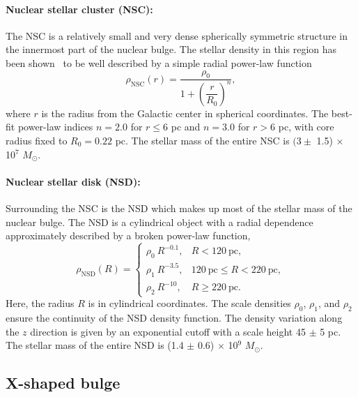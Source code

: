 \documentclass[doublespace,nopageskip]{VTthesis}
\begin{document}
\paragraph{Nuclear stellar cluster (NSC):} The NSC is a relatively small and very dense spherically symmetric structure in the innermost part of the nuclear bulge. The stellar density in this region has been shown~\cite{2002A&A...384..112L} to be well described by a simple radial power-law function
\begin{equation}\label{eq:NSC}
  \rho_{\text{NSC}}(r)=\dfrac{\rho_0}{1+\left(\dfrac{r}{R_0}\right)^{n}},
\end{equation}
{where $r$ is the radius from the Galactic center in spherical coordinates.} The best-fit power-law indices $n = 2.0$ for $r \leq 6$ pc and $n = 3.0$ for $r > 6$ pc, with core radius fixed to $R_0 = 0.22$ pc. The stellar mass of the entire NSC is $(3\pm$ 1.5) $\times$ 10$^7$ $M_\odot$.

\paragraph{Nuclear stellar disk (NSD):} Surrounding the NSC is the NSD which makes up most of the stellar mass of the nuclear bulge. The NSD is a cylindrical object with a radial dependence approximately described by a broken power-law function,
\begin{equation}\label{eq:NSD}
  \rho_{\text{NSD}}(R) = \begin{cases}
    \rho_0\ R^{-0.1}, & R < 120\ \text{pc},\\
    \rho_1\ R^{-3.5}, & 120\ \text{pc} \leq R < 220\ \text{pc},\\
    \rho_2\ R^{-10}, & R \geq 220\ \text{pc}.
  \end{cases}
\end{equation}
{Here, the radius $R$ is in cylindrical coordinates. } The scale densities $\rho_0$, $\rho_1$, and $\rho_2$ ensure the continuity of the NSD density function. The density variation along the $z$ direction is given by an exponential cutoff with a scale height 45 $\pm$ 5 pc. The stellar mass of the entire NSD is (1.4 $\pm$ 0.6) $\times$ 10$^9$ $M_\odot$.

\subsection{X-shaped bulge}
\end{document}
